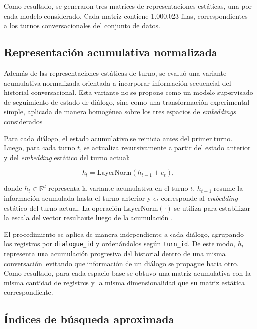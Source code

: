 \documentclass[runningheads]{llncs}
\begin{document}
Como resultado, se generaron tres matrices de representaciones estáticas, una por cada modelo considerado. Cada matriz contiene 1.000.023 filas, correspondientes a los turnos conversacionales del conjunto de datos.

\subsection{Representación acumulativa normalizada}

Además de las representaciones estáticas de turno, se evaluó una variante acumulativa normalizada orientada a incorporar información secuencial del historial conversacional. Esta variante no se propone como un modelo supervisado de seguimiento de estado de diálogo, sino como una transformación experimental simple, aplicada de manera homogénea sobre los tres espacios de \textit{embeddings} considerados.

Para cada diálogo, el estado acumulativo se reinicia antes del primer turno. Luego, para cada turno $t$, se actualiza recursivamente a partir del estado anterior y del \textit{embedding} estático del turno actual:

\begin{equation}
    h_t = \mathrm{LayerNorm}(h_{t-1} + e_t),
\end{equation}

\noindent donde $h_t \in \mathbb{R}^d$ representa la variante acumulativa en el turno $t$, $h_{t-1}$ resume la información acumulada hasta el turno anterior y $e_t$ corresponde al \textit{embedding} estático del turno actual. La operación $\mathrm{LayerNorm}(\cdot)$ se utiliza para estabilizar la escala del vector resultante luego de la acumulación \cite{ba2016layer}.

El procedimiento se aplica de manera independiente a cada diálogo, agrupando los registros por \texttt{dialogue\_id} y ordenándolos según \texttt{turn\_id}. De este modo, $h_t$ representa una acumulación progresiva del historial dentro de una misma conversación, evitando que información de un diálogo se propague hacia otro. Como resultado, para cada espacio base se obtuvo una matriz acumulativa con la misma cantidad de registros y la misma dimensionalidad que su matriz estática correspondiente.

\subsection{Índices de búsqueda aproximada}
\end{document}
